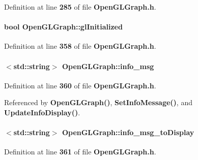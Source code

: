Definition at line {\bf 285} of file {\bf Open\+G\+L\+Graph.\+h}.

\paragraph[{gl\+Initialized}]{\setlength{\rightskip}{0pt plus 5cm}bool Open\+G\+L\+Graph\+::gl\+Initialized\hspace{0.3cm}{\ttfamily [private]}}\label{classOpenGLGraph_a3a3ffae3aa9ec3993ded94ac31942616}


Definition at line {\bf 358} of file {\bf Open\+G\+L\+Graph.\+h}.

\paragraph[{info\+\_\+msg}]{$<${\bf std\+::string}$>$ Open\+G\+L\+Graph\+::info\+\_\+msg\hspace{0.3cm}{\ttfamily [private]}}\label{classOpenGLGraph_aec98359d9ce1401a0d56b56094e8b251}


Definition at line {\bf 360} of file {\bf Open\+G\+L\+Graph.\+h}.



Referenced by {\bf Open\+G\+L\+Graph()}, {\bf Set\+Info\+Message()}, and {\bf Update\+Info\+Display()}.

\paragraph[{info\+\_\+msg\+\_\+to\+Display}]{$<${\bf std\+::string}$>$ Open\+G\+L\+Graph\+::info\+\_\+msg\+\_\+to\+Display\hspace{0.3cm}{\ttfamily [private]}}\label{classOpenGLGraph_a04a2187021ff366ed81d5e005c9f8979}


Definition at line {\bf 361} of file {\bf Open\+G\+L\+Graph.\+h}.



